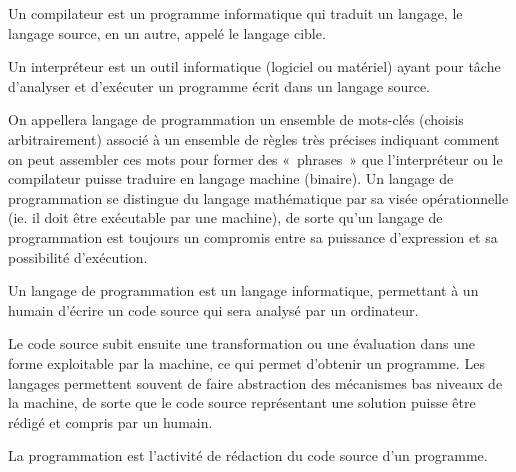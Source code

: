 \begin{defin}[compilateur]
	Un compilateur est un programme informatique qui traduit un langage, 
	le langage source, en un autre, appelé le langage cible. 
\end{defin}

\begin{defin}[interpréteur]
	Un interpréteur est un outil informatique (logiciel ou matériel) ayant pour tâche 
	d'analyser et d'exécuter un programme écrit dans un langage source.
\end{defin}

On appellera langage de programmation un ensemble de mots-clés (choisis arbitrairement) 
associé à un ensemble de règles très précises indiquant comment on peut assembler ces mots 
pour former des «~phrases~» que l'interpréteur ou le compilateur puisse traduire en langage 
machine (binaire).
Un langage de programmation se distingue du langage mathématique par sa visée opérationnelle
(ie. il doit être exécutable par une machine), de sorte qu'un langage de programmation est 
toujours un compromis entre sa puissance d'expression et sa possibilité d'exécution.

\begin{defin}
Un langage de programmation est un langage informatique, permettant à un 
humain d'écrire un code source qui sera analysé par un ordinateur. 
\end{defin}

Le code source subit ensuite une transformation ou une évaluation dans une forme exploitable par la machine, ce qui permet d'obtenir un programme. Les langages permettent souvent de faire abstraction des mécanismes bas niveaux de la machine, de sorte que le code source représentant une solution puisse être rédigé et compris par un humain.

\begin{defin}[programmation]
La programmation est l'activité de rédaction du code source d'un programme.
\end{defin}


